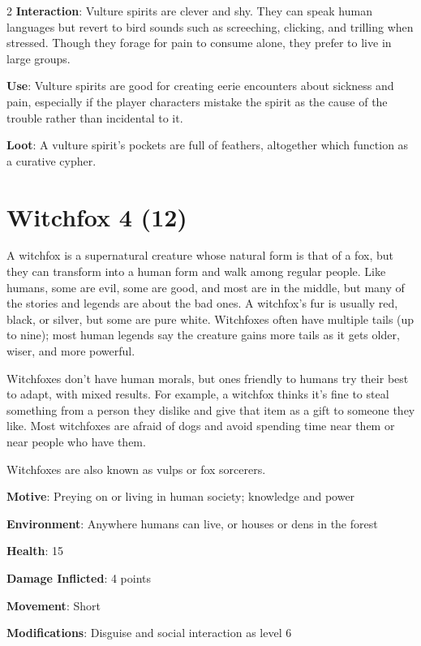 \begin{multicols}{2}
\textbf{Interaction}: Vulture spirits are clever and shy. They can speak human languages but revert to bird sounds such as screeching, clicking, and trilling when stressed. Though they forage for pain to consume alone, they prefer to live in large groups. 

\textbf{Use}: Vulture spirits are good for creating eerie encounters about sickness and pain, especially if the player characters mistake the spirit as the cause of the trouble rather than incidental to it. 

\textbf{Loot}: A vulture spirit’s pockets are full of feathers, altogether which function as a curative cypher. 

\section{Witchfox 4 (12)}

A witchfox is a supernatural creature whose natural form is that of a fox, but they can transform into a human form and walk among regular people. Like humans, some are evil, some are good, and most are in the middle, but many of the stories and legends are about the bad ones. A witchfox’s fur is usually red, black, or silver, but some are pure white. Witchfoxes often have multiple tails (up to nine); most human legends say the creature gains more tails as it gets older, wiser, and more powerful. 

Witchfoxes don’t have human morals, but ones friendly to humans try their best to adapt, with mixed results. For example, a witchfox thinks it’s fine to steal something from a person they dislike and give that item as a gift to someone they like.  Most witchfoxes are afraid of dogs and avoid spending time near them or near people who have them.

Witchfoxes are also known as vulps or fox sorcerers.

\textbf{Motive}: Preying on or living in human society; knowledge and power 

\textbf{Environment}: Anywhere humans can live, or houses or dens in the forest 

\textbf{Health}: 15 

\textbf{Damage Inflicted}: 4 points 

\textbf{Movement}: Short 

\textbf{Modifications}: Disguise and social interaction as level 6 


\end{multicols}
